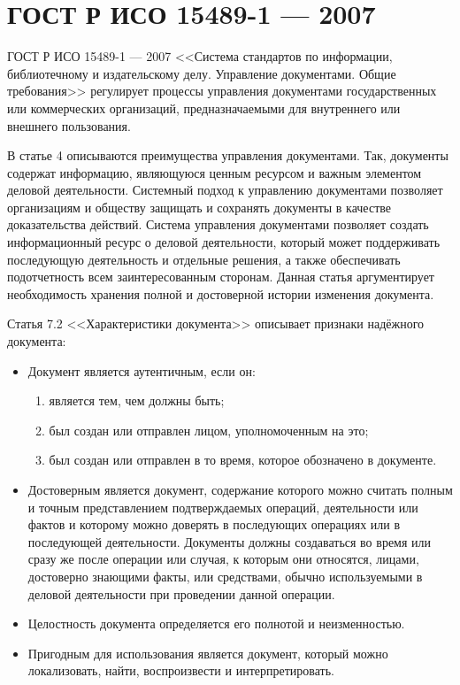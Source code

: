 \section{ГОСТ Р ИСО 15489-1 --- 2007} \label{rights_gost_15489_1}

ГОСТ Р ИСО 15489-1 --- 2007 <<Система стандартов по информации, библиотечному и издательскому делу. Управление документами. Общие требования>> регулирует процессы управления документами государственных или коммерческих организаций, предназначаемыми для внутреннего или внешнего пользования.

В статье 4 описываются преимущества управления документами. Так, документы содержат информацию, являющуюся ценным ресурсом и важным элементом деловой деятельности. Системный подход к управлению документами позволяет организациям и обществу защищать и сохранять документы в качестве доказательства действий. Система управления документами позволяет создать информационный ресурс о деловой деятельности, который может поддерживать последующую деятельность и отдельные решения, а также обеспечивать подотчетность всем заинтересованным сторонам. Данная статья аргументирует необходимость хранения полной и достоверной истории изменения документа.

Статья 7.2 <<Характеристики документа>> описывает признаки надёжного документа:
\begin{itemize}
	\item Документ является аутентичным, если он:
	\begin{enumerate}
	\item является тем, чем должны быть;
	\item был создан или отправлен лицом, уполномоченным на это;
	\item был создан или отправлен в то время, которое обозначено в документе.
	\end{enumerate}
	\item Достоверным является документ, содержание которого можно считать полным и точным представлением подтверждаемых операций, деятельности или фактов и которому можно доверять в последующих операциях или в последующей деятельности. Документы должны создаваться во время или сразу же после операции или случая, к которым они относятся, лицами, достоверно знающими факты, или средствами, обычно используемыми в деловой деятельности при проведении данной операции.
	\item Целостность документа определяется его полнотой и неизменностью.
	\item Пригодным для использования является документ, который можно локализовать, найти, воспроизвести и интерпретировать.
\end{itemize}